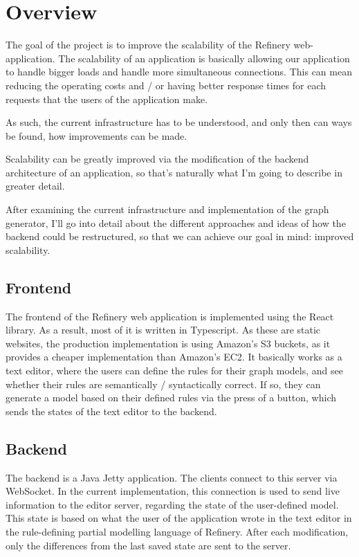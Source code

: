 \chapter{Overview}
	The goal of the project is to improve the scalability of the Refinery web-application. 
	The scalability of an application is basically allowing our application to handle bigger loads and handle more simultaneous connections.
	This can mean reducing the operating costs and / or having better response times for each requests that the users of the application make. 

	As such, the current
	infrastructure has to be understood, and only then can ways be found, how improvements can be made.

	Scalability can be greatly improved via the modification of the backend architecture of an application, so that's naturally what
	I'm going to describe in greater detail. 

	After examining the current infrastructure and implementation of the graph generator, 
	I'll go into detail about the different approaches and ideas of how the backend could be restructured,
	so that we can achieve our goal in mind: improved scalability. 

\section{Frontend}
	The frontend of the Refinery web application is implemented using the React library. As a result, most of it is written in Typescript.
	As these are static websites, the production implementation is using Amazon's S3 buckets, as it provides a cheaper implementation
	than Amazon's EC2. 
	It basically works as a text editor, where the users can define the rules for their graph models, and see whether
	their rules are semantically / syntactically correct. If so, they can generate a model based on their defined rules
	via the press of a button, which sends the states of the text editor to the backend.

\section{Backend}

	The backend is a Java Jetty application. The clients connect to this server via WebSocket. 
	In the current implementation,
	this connection is used to send live information to the editor server, 
	regarding the state of the user-defined model.
	This state is based on what the user of the application wrote in the text editor in the
	rule-defining partial modelling language of Refinery. After each modification, only the differences
	from the last saved state are sent to the server.

